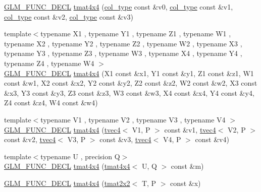 \begin{DoxyCompactItemize}
\item 
\hyperlink{setup_8hpp_ab2d052de21a70539923e9bcbf6e83a51}{G\+L\+M\+\_\+\+F\+U\+N\+C\+\_\+\+D\+E\+CL} \hyperlink{structglm_1_1detail_1_1tmat4x4_a65b09ee09ead59d815720ec0e73737fb}{tmat4x4} (\hyperlink{structglm_1_1detail_1_1tmat4x4_ade9e794ddd9c2758005f29ddb84e320f}{col\+\_\+type} const \&v0, \hyperlink{structglm_1_1detail_1_1tmat4x4_ade9e794ddd9c2758005f29ddb84e320f}{col\+\_\+type} const \&v1, \hyperlink{structglm_1_1detail_1_1tmat4x4_ade9e794ddd9c2758005f29ddb84e320f}{col\+\_\+type} const \&v2, \hyperlink{structglm_1_1detail_1_1tmat4x4_ade9e794ddd9c2758005f29ddb84e320f}{col\+\_\+type} const \&v3)
\item 
{\footnotesize template$<$typename X1 , typename Y1 , typename Z1 , typename W1 , typename X2 , typename Y2 , typename Z2 , typename W2 , typename X3 , typename Y3 , typename Z3 , typename W3 , typename X4 , typename Y4 , typename Z4 , typename W4 $>$ }\\\hyperlink{setup_8hpp_ab2d052de21a70539923e9bcbf6e83a51}{G\+L\+M\+\_\+\+F\+U\+N\+C\+\_\+\+D\+E\+CL} \hyperlink{structglm_1_1detail_1_1tmat4x4_afe1431c016d4a0261e597d4c4794d45c}{tmat4x4} (X1 const \&x1, Y1 const \&y1, Z1 const \&z1, W1 const \&w1, X2 const \&x2, Y2 const \&y2, Z2 const \&z2, W2 const \&w2, X3 const \&x3, Y3 const \&y3, Z3 const \&z3, W3 const \&w3, X4 const \&x4, Y4 const \&y4, Z4 const \&z4, W4 const \&w4)
\item 
{\footnotesize template$<$typename V1 , typename V2 , typename V3 , typename V4 $>$ }\\\hyperlink{setup_8hpp_ab2d052de21a70539923e9bcbf6e83a51}{G\+L\+M\+\_\+\+F\+U\+N\+C\+\_\+\+D\+E\+CL} \hyperlink{structglm_1_1detail_1_1tmat4x4_a1d5edd29def5b7c600505373f7dab5a2}{tmat4x4} (\hyperlink{structglm_1_1detail_1_1tvec4}{tvec4}$<$ V1, P $>$ const \&v1, \hyperlink{structglm_1_1detail_1_1tvec4}{tvec4}$<$ V2, P $>$ const \&v2, \hyperlink{structglm_1_1detail_1_1tvec4}{tvec4}$<$ V3, P $>$ const \&v3, \hyperlink{structglm_1_1detail_1_1tvec4}{tvec4}$<$ V4, P $>$ const \&v4)
\item 
{\footnotesize template$<$typename U , precision Q$>$ }\\\hyperlink{setup_8hpp_ab2d052de21a70539923e9bcbf6e83a51}{G\+L\+M\+\_\+\+F\+U\+N\+C\+\_\+\+D\+E\+CL} \hyperlink{structglm_1_1detail_1_1tmat4x4_a075d7a65803598d3f219f23ca08ba21f}{tmat4x4} (\hyperlink{structglm_1_1detail_1_1tmat4x4}{tmat4x4}$<$ U, Q $>$ const \&m)
\item 
\hyperlink{setup_8hpp_ab2d052de21a70539923e9bcbf6e83a51}{G\+L\+M\+\_\+\+F\+U\+N\+C\+\_\+\+D\+E\+CL} \hyperlink{structglm_1_1detail_1_1tmat4x4_a583fe3150c192a6405b2042f713ffc67}{tmat4x4} (\hyperlink{structglm_1_1detail_1_1tmat2x2}{tmat2x2}$<$ T, P $>$ const \&x)

\end{DoxyCompactItemize}

